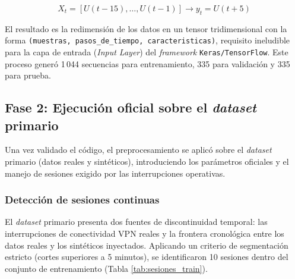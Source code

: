 \documentclass[12pt]{report}
\begin{document}
\begin{equation}
    X_t = \left[U(t-15), \dots, U(t-1)\right] \longrightarrow y_t = U(t+5)
    \label{eq:ventaneo_instanciada_mawi}
\end{equation}

El resultado es la redimensión de los datos en un tensor tridimensional con la forma \texttt{(muestras, pasos\_de\_tiempo, caracteristicas)}, requisito ineludible para la capa de entrada (\textit{Input Layer}) del \textit{framework} \texttt{Keras/TensorFlow}. Este proceso generó 1\,044 secuencias para entrenamiento, 335 para validación y 335 para prueba.

\subsection*{Fase 2: Ejecución oficial sobre el \textit{dataset} primario}

Una vez validado el código, el preprocesamiento se aplicó sobre el \textit{dataset} primario (datos reales y sintéticos), introduciendo los parámetros oficiales y el manejo de sesiones exigido por las interrupciones operativas.

\subsubsection*{Detección de sesiones continuas}

El \textit{dataset} primario presenta dos fuentes de discontinuidad temporal: las interrupciones de conectividad VPN reales y la frontera cronológica entre los datos reales y los sintéticos inyectados. Aplicando un criterio de segmentación estricto (cortes superiores a 5 minutos), se identificaron 10 sesiones dentro del conjunto de entrenamiento 
(Tabla \ref{tab:sesiones_train}).
\end{document}
